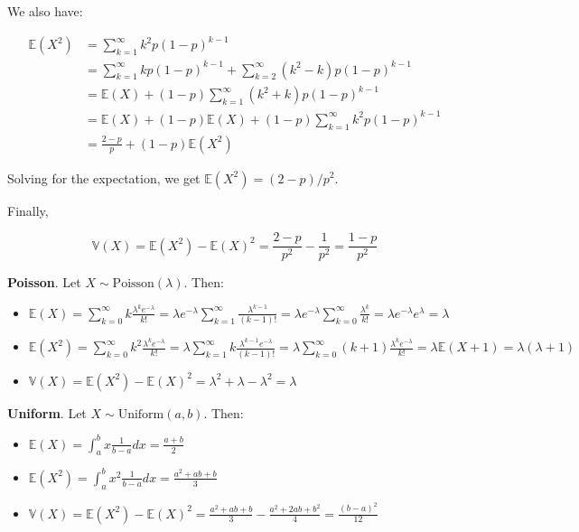 We also have:

\begin{align*}
\mathbb{E}(X^{2}) &= \sum_{k=1}^{\infty} k^{2} p (1 - p)^{k - 1}  \\
&= \sum_{k=1}^{\infty} k p(1-p)^{k-1} + \sum_{k=2}^{\infty} (k^{2} - k) p(1-p)^{k - 1} \\
&= \mathbb{E}(X) + (1 - p) \sum_{k=1}^{\infty} (k^{2} + k) p(1-p)^{k - 1} \\
&= \mathbb{E}(X) + (1 - p) \mathbb{E}(X) + (1 - p) \sum_{k=1}^{\infty} k^{2} p(1-p)^{k-1} \\
&= \frac{2 - p}{p} + (1 - p) \mathbb{E}(X^{2})
\end{align*}

Solving for the expectation, we get \(\mathbb{E}(X^{2}) = (2 - p) / p^{2}\).

Finally,

\[ \mathbb{V}(X) = \mathbb{E}(X^{2}) - \mathbb{E}(X)^{2} = \frac{2 - p}{p^{2}} - \frac{1}{p^{2}} = \frac{1 - p}{p^{2}} \]

\textbf{Poisson}. Let \(X \sim \text{Poisson}(\lambda)\). Then:

\begin{itemize}
\item
  \( \mathbb{E}(X) = \sum_{k=0}^{\infty} k
  \frac{\lambda^{k} e^{-\lambda}}{k!} = \lambda e^{-\lambda}
  \sum_{k=1}^{\infty} \frac{\lambda^{k - 1} }{(k - 1)!} =
  \lambda e^{-\lambda} \sum_{k=0}^{\infty} \frac{\lambda^{k}}{k!}
  = \lambda e^{-\lambda} e^{\lambda} = \lambda \)
\item
  \( \mathbb{E}(X^{2}) = \sum_{k=0}^{\infty}k^{2}
  \frac{\lambda^{k} e^{-\lambda}}{k!} = \lambda \sum_{k=1}^{\infty} k
  \frac{\lambda^{k-1} e^{-\lambda} }{(k-1)!} =
  \lambda \sum_{k=0}^{\infty} (k + 1)
  \frac{\lambda^{k} e^{-\lambda} }{k!} = \lambda \mathbb{E}(X + 1) =
  \lambda(\lambda + 1) \)
\item
  \( \mathbb{V}(X) = \mathbb{E}(X^{2}) - \mathbb{E}(X)^{2} =
  \lambda^{2} + \lambda - \lambda^{2} = \lambda \)
\end{itemize}

\textbf{Uniform}. Let \(X \sim \text{Uniform}(a, b)\). Then:

\begin{itemize}[tightlist]
\item
  \(\mathbb{E}(X) = \int_a^{b} x \frac{1}{b - a} dx = \frac{a + b}{2}\)
\item
  \(\mathbb{E}(X^{2}) = \int_a^{b} x^{2} \frac{1}{b - a} dx = \frac{a^{2} + ab + b}{3}\)
\item
  \(\mathbb{V}(X) = \mathbb{E}(X^{2}) - \mathbb{E}(X)^{2} = \frac{a^{2} + ab + b}{3} - \frac{a^{2} + 2ab + b^{2}}{4} = \frac{(b - a)^{2}}{12}\)
\end{itemize}

